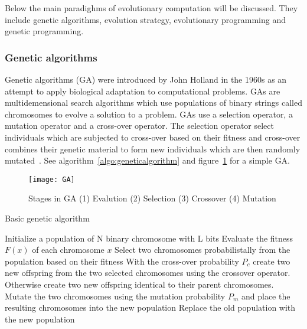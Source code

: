 Below the main paradighms of evolutionary computation will be discussed. They include genetic algorithms, evolution strategy, evolutionary programming and genetic programming.

\subsubsection{Genetic algorithms}

Genetic algorithms (GA) were introduced by John Holland in the 1960s as an attempt to apply biological adaptation to computational problems. GAs are multidemensional search algorithms which use populations of binary strings called chromosomes to evolve a solution to a problem. GAs use a selection operator, a mutation operator and a cross-over operator. The selection operator select individuals which are subjected to cross-over based on their fitness and cross-over combines their genetic material to form new individuals which are then randomly mutated~\cite{mitchel1999evolutionary}. See algorithm~\ref{algo:geneticalgorithm} and figure~\ref{fig:GA} for a simple GA.

\begin{figure}[H]
  \centering
  \texttt{[image: GA]}
  \caption{Stages in GA (1) Evalution (2) Selection (3) Crossover (4) Mutation}
  \label{fig:GA}
\end{figure}

\begin{algorithm}[h]

  \caption{Basic genetic algorithm}
  \label{algo:geneticalgorithm}
    \begin{algorithmic}
       \State Initialize a population of N binary chromosome with L bits
        \State Evaluate the fitness $F(x)$ of each chromosome $x$
        \Repeat
          \State Select two chromosomes probabilistally from the population
          \State based on their fitness
          \State With the cross-over probability $P_c$ create two new offspring
          \State from the two selected chromosomes using the crossover operator.
          \State Otherwise create two new offspring identical to their parent chromosomes.
          \State Mutate the two chromosomes using the mutation probability $P_m$
          \State and place the resulting chromosomes into the new population
        \State Replace the old population with the new population
       \EndWhile
    \end{algorithmic}
\end{algorithm}

